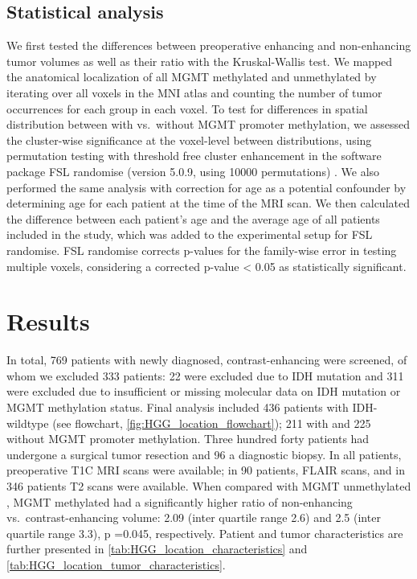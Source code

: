 \subsection{Statistical analysis}
We first tested the differences between preoperative enhancing and non-enhancing \gls{tumor} volumes as well as their ratio with the Kruskal-Wallis test.
We mapped the anatomical localization of all \gls{MGMT} methylated and unmethylated  by iterating over all voxels in the \gls{MNI} atlas and counting the number of \gls{tumor} occurrences for each group in each voxel.
To test for differences in spatial distribution between  with vs.\ without \gls{MGMT} promoter methylation, we assessed the cluster-wise significance at the voxel-level between distributions, using permutation testing with threshold free cluster enhancement in the software package \gls{FSL} randomise (version 5.0.9, using \num{10000} permutations) \autocite{smith2009threshold, winkler2014permutation}.
We also performed the same analysis with correction for age as a potential confounder by determining age for each patient at the time of the \gls{MRI} scan.
We then calculated the difference between each patient's age and the average age of all patients included in the study, which was added to the experimental setup for \gls{FSL} randomise.
\gls{FSL} randomise corrects p-values for the family-wise error in testing multiple voxels, considering a corrected p-value \num{< 0.05} as statistically significant.


\section{Results}


In total, 769 patients with newly diagnosed, contrast-enhancing  were screened, of whom we excluded 333 patients: 22 were excluded due to \gls{IDH} mutation and 311 were excluded due to insufficient or missing molecular data on \gls{IDH} mutation or \gls{MGMT} methylation status.
Final analysis included 436 patients with \gls{IDH}-wildtype  (see flowchart, \cref{fig:HGG_location_flowchart}); 211 with and 225 without \gls{MGMT} promoter methylation.
Three hundred forty patients had undergone a surgical \gls{tumor} resection and 96 a diagnostic biopsy.
In all patients, preoperative \gls{T1C} \gls{MRI} scans were available; in 90 patients, \gls{FLAIR} scans, and in 346 patients \gls{T2} scans were available.
When compared with \gls{MGMT} unmethylated , \gls{MGMT} methylated  had a significantly higher ratio of non-enhancing vs.\ contrast-enhancing volume: \num{2.09} (inter quartile range \num{2.6}) and \num{2.5} (inter quartile range \num{3.3}), p \num{=0.045}, respectively.
Patient and \gls{tumor} characteristics are further presented in \cref{tab:HGG_location_characteristics} and \cref{tab:HGG_location_tumor_characteristics}.

